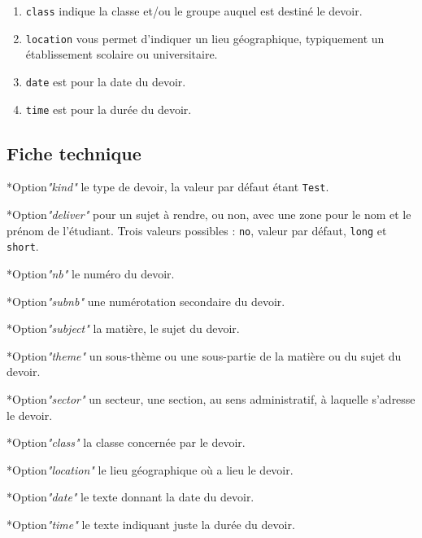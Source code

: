 \documentclass[12pt,a4paper]{scrartcl}
\makeatletter
\theoremstyle{definition}
\newcommand\IDmacro{\@ifstar{\@IDmacroStar}{\@IDmacroNoStar}}
\newcommand\@IDmacroNoStar[3]{%
    \texttt{%
    	\textbackslash#1%
    	\IfStrEq{#2}{0}{}{%
    		\,\,[#2 Option%
			\IfStrEq{#2}{1}{}{s}]%
		}%
	    \IfStrEq{#3}{}{}{%
    		\,\,(#3 Argument%
			\IfStrEq{#3}{1}{}{s})%
		}
   	}
    \immediate\write\tempfile{macro@#1@#2@#3}%
}
\newcommand\@IDmacroStar[2]{%
    \@IDmacroNoStar{#1}{0}{#2}%
}
\newcommand\@IDoptarg{\@ifstar{\@IDoptargStar}{\@IDoptargNoStar}}
\newcommand\@IDoptargStar[2]{%
	\vspace{0.5em}
	--- \texttt{#1%
		\IfStrEq{#2}{}{:}{\,#2:}%
	}%
}
\newcommand\@IDoptargNoStar[2]{%
	\IfStrEq{#2}{}{%
		\@IDoptargStar{#1}{}%
	}{%
		\@IDoptargStar{#1}{\##2}%
	}%
}
\newcommand\IDkey[1]{%
	\@IDoptarg*{Option}{{\itshape "#1"}}%
}
\makeatother
\begin{document}
\begin{enumerate}
	\item \verb+class+ indique la classe et/ou le groupe auquel est destiné le devoir.

	\item \verb+location+ vous permet d'indiquer un lieu géographique, typiquement un établissement scolaire ou universitaire.

	\item \verb+date+ est pour la date du devoir.

	\item \verb+time+ est pour la durée du devoir.
\end{enumerate}


%


	\subsection{Fiche technique}

\IDmacro{exam}{11}{}

\IDkey{kind} le type de devoir, la valeur par défaut étant \verb+Test+.

\IDkey{deliver} pour un sujet à rendre, ou non, avec une zone pour le nom et le prénom de l'étudiant. Trois valeurs possibles : \verb+no+, valeur par défaut, \verb+long+ et \verb+short+.

\IDkey{nb} le numéro du devoir.

\IDkey{subnb} une numérotation secondaire du devoir.

\IDkey{subject} la matière, le sujet du devoir.

\IDkey{theme} un sous-thème ou une sous-partie de la matière ou du sujet du devoir.

\IDkey{sector} un secteur, une section, au sens administratif, à laquelle s'adresse le devoir.

\IDkey{class} la classe concernée par le devoir.

\IDkey{location} le lieu géographique où a lieu le devoir.

\IDkey{date} le texte donnant la date du devoir.

\IDkey{time} le texte indiquant juste la durée du devoir.
\end{document}

